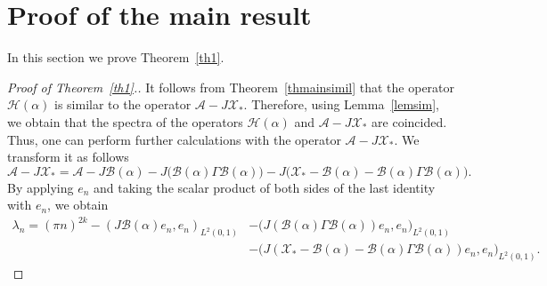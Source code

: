 \documentclass[11pt,centertags,reqno,twoside]{amsart}
\numberwithin{equation}{section}
\theoremstyle{definition}
\theoremstyle{remark}
\begin{document}
\section{Proof of the main result}\label{sec6}
In this section we prove Theorem~\ref{th1}.
\begin{proof}[Proof of Theorem~\ref{th1}.]
It follows from Theorem~\ref{thmainsimil} that the operator $\mathcal{H}(\alpha)$
is similar to the operator $\mathcal{A}-J\mathcal{X}_*$. Therefore, using
Lemma~\ref{lemsim}, we obtain that the spectra of the operators $\mathcal{H}(\alpha)$
and $\mathcal{A}-J\mathcal{X}_*$ are coincided. Thus, one can perform further calculations
with the operator $\mathcal{A}-J\mathcal{X}_*$. We transform it as follows
\[
\mathcal{A}-J\mathcal{X}_*=\mathcal{A}-J\mathcal{B}(\alpha)
-J\big(\mathcal{B}(\alpha)\Gamma\mathcal{B}(\alpha)\big)
-J\big(\mathcal{X}_*-\mathcal{B}(\alpha)-\mathcal{B}(\alpha)\Gamma\mathcal{B}(\alpha)\big).
\]
By applying $e_n$ and taking the scalar product of both sides of the last
identity with $e_n$, we obtain
\begin{equation}\label{abstrasympt}
\begin{aligned}
\lambda_n = (\pi n)^{2k}-(J\mathcal{B}(\alpha)e_n, e_n)_{L^2(0, 1)}
&-\big(J(\mathcal{B}(\alpha)\Gamma
\mathcal{B}(\alpha))e_n, e_n\big)_{L^2(0, 1)} \\
&-\big(J(\mathcal{X}_*-\mathcal{B}(\alpha)
-\mathcal{B}(\alpha)\Gamma\mathcal{B}(\alpha))e_n, e_n\big)_{L^2(0, 1)}.
\end{aligned}
\end{equation}


\end{proof}
\end{document}
